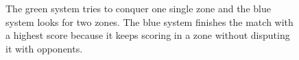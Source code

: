 \begin{figure}
	\centering
	\hspace{0cm} %
	\caption{The green system tries to conquer one single zone and the blue system looks for two zones. The blue system finishes the match with a highest score because it keeps scoring in a zone without disputing it with opponents.}
	\label{fig:1x2morrinho}
\end{figure} 


